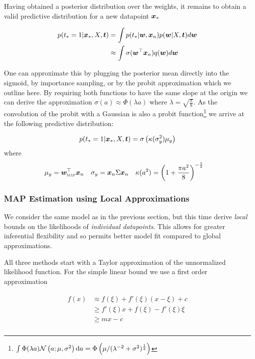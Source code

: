 Having obtained a posterior distribution over the weights, it remains to obtain a valid predictive distribution for a new datapoint $\bm x_*$

\begin{align}
p(t_* = 1| \bm x_*, X, \bm t) & = \int p(t_*|\bm w, \bm x_n)p(\bm w|X,\bm t) d\bm w \\
 & \approx \int \sigma(\bm w^\top\bm x_n)q(\bm w) d\bm w
\end{align}

One can approximate this by plugging the posterior mean directly into the sigmoid, by importance sampling, or by the probit approximation\cite{Barber1998} which we outline here. By requiring both functions to have the same slope at the origin we can derive the approximation $\sigma(a) \approx \Phi(\lambda a)$ where $\lambda = \sqrt{\frac{\pi}{8}}$. As the convolution of the probit with a Gaussian is also a probit function\footnote{$\int \Phi(\lambda a)\mathcal{N} \left(a; \mu, \sigma^2\right) \text{d}a = \Phi\left(\mu / (\lambda^{-2} + \sigma^2)^{\frac{1}{2}} \right)$} we arrive at the following predictive distribution:

\begin{align}
p(t_* = 1 | \bm x_*, X, \bm t) = \sigma\left( \kappa(\sigma_y^2) \mu_y \right)
\end{align}
where
\begin{align}
\mu_y       & = \bm w_{\text{\tiny \sc MAP}}^\top\bm x_n &
\sigma_y    & = \bm x_n \Sigma \bm x_n &
\kappa(a^2) & = \left( 1 + \frac{\pi a^2}{8}  \right)^{-\frac{1}{2}}
\end{align}

\subsubsection*{MAP Estimation using Local Approximations}

We consider the same model as in the previous section, but this time derive \emph{local} bounds on the likelihoods of \emph{individual datapoints}. This allows for greater inferential flexibility and so permits better model fit compared to global approximations\cite{Jaakkola1997}.

All three methods start with a Taylor approximation of the unnormalized likelihood function. For the simple linear bound we use a first order approximation

\begin{align}
\begin{split}
f(x) & \approx f(\xi) + f'(\xi) (x - \xi) + c \\
 & \geq f'(\xi) x + f(\xi) - f'(\xi)\xi \\
 & \geq m x - c \\
\end{split}
\end{align}

